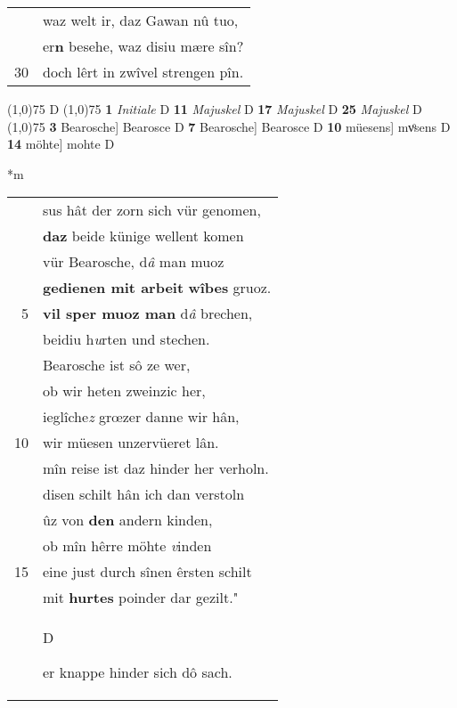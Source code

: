 \documentclass[8pt,a4paper,notitlepage]{article}
\begin{document}
\begin{table}[ht]
\begin{minipage}[t]{0.5\linewidth}
\begin{tabular}{rl}
 & waz welt ir, daz Gawan nû tuo,\\ 
 & er\textbf{n} besehe, waz disiu mære sîn?\\ 
30 & doch lêrt in zwîvel strengen pîn.\\ 
\end{tabular}
\scriptsize
\line(1,0){75} \newline
D \newline
\line(1,0){75} \newline
\textbf{1} \textit{Initiale} D  \textbf{11} \textit{Majuskel} D  \textbf{17} \textit{Majuskel} D  \textbf{25} \textit{Majuskel} D  \newline
\line(1,0){75} \newline
\textbf{3} Bearosche] Bearosce D \textbf{7} Bearosche] Bearosce D \textbf{10} müesens] mvͦsens D \textbf{14} möhte] mohte D \newline
\end{minipage}
\hspace{0.5cm}
\begin{minipage}[t]{0.5\linewidth}
\small
\begin{center}*m
\end{center}
\begin{tabular}{rl}
 & sus hât der zorn sich vür genomen,\\ 
 & \textbf{daz} beide künige wellent komen\\ 
 & vür Bearosche, d\textit{â} man muoz\\ 
 & \textbf{gedienen mit arbeit} \textbf{wîbes} gruoz.\\ 
5 & \textbf{vil sper muoz man} d\textit{â} brechen,\\ 
 & beidiu h\textit{u}rten und stechen.\\ 
 & Bearosche ist sô ze wer,\\ 
 & ob wir heten zweinzic her,\\ 
 & ieglîche\textit{z} grœzer danne wir hân,\\ 
10 & wir müesen  unzervüeret lân.\\ 
 & mîn reise ist daz hinder her verholn.\\ 
 & disen schilt hân ich dan verstoln\\ 
 & ûz von \textbf{den} andern kinden,\\ 
 & ob mîn hêrre möhte \textit{v}inden\\ 
15 & eine just durch sînen êrsten schilt\\ 
 & mit \textbf{hurtes} poinder dar gezilt."\\ 
 & \begin{large}D\end{large}er knappe hinder sich dô sach.\\ 

\end{tabular}
\end{minipage}
\end{table}
\end{document}
